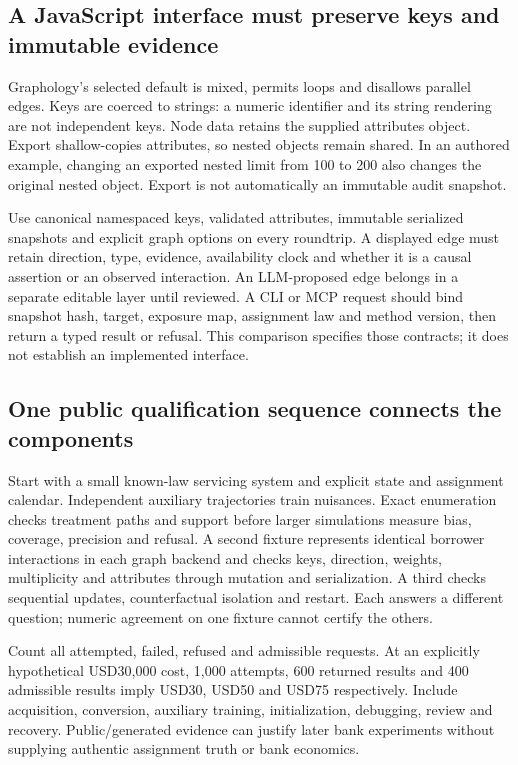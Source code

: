 \subsection{A JavaScript interface must preserve keys and immutable evidence}

Graphology's selected default is mixed, permits loops and disallows parallel
edges. Keys are coerced to strings: a numeric identifier and its string
rendering are not independent keys. Node data retains the supplied attributes
object. Export shallow-copies attributes, so nested objects remain shared.
In an authored example, changing an exported nested limit from 100 to 200 also
changes the original nested object. Export is not automatically an immutable
audit snapshot.\citep{exec25_onet_graphology,exec25_onet_choice}

Use canonical namespaced keys, validated attributes, immutable serialized
snapshots and explicit graph options on every roundtrip. A displayed edge
must retain direction, type, evidence, availability clock and whether it is
a causal assertion or an observed interaction. An LLM-proposed edge belongs
in a separate editable layer until reviewed. A CLI or MCP request should bind
snapshot hash, target, exposure map, assignment law and method version, then
return a typed result or refusal. This comparison specifies those contracts;
it does not establish an implemented interface.
\citep{exec25_onet_graphology,exec25_onet_choice}

\subsection{One public qualification sequence connects the components}

Start with a small known-law servicing system and explicit state and assignment
calendar. Independent auxiliary trajectories train nuisances. Exact enumeration
checks treatment paths and support before larger simulations measure bias,
coverage, precision and refusal. A second fixture represents identical borrower
interactions in each graph backend and checks keys, direction, weights,
multiplicity and attributes through mutation and serialization. A third checks
sequential updates, counterfactual isolation and restart. Each answers a
different question; numeric agreement on one fixture cannot certify the others.
\citep{exec25_onet_choice}

Count all attempted, failed, refused and admissible requests. At an explicitly
hypothetical USD30,000 cost, 1,000 attempts, 600 returned results and 400
admissible results imply USD30, USD50 and USD75 respectively. Include acquisition,
conversion, auxiliary training, initialization, debugging, review and recovery.
Public/generated evidence can justify later bank experiments without supplying
authentic assignment truth or bank economics.\citep{exec25_onet_choice}

